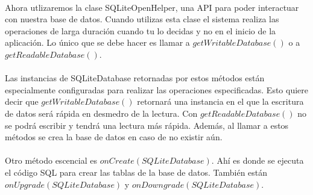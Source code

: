 \documentclass[10pt]{extarticle}
\begin{document}
\paragraph{}
Ahora utlizaremos la clase SQLiteOpenHelper, una API para poder interactuar con nuestra base de datos. Cuando utilizas esta clase el sistema realiza las operaciones de larga duración cuando tu lo decidas y no en el inicio de la aplicación. Lo único que se debe hacer es llamar a $getWritableDatabase()$ o a $getReadableDatabase()$. 
\paragraph{}
Las instancias de SQLiteDatabase retornadas por estos métodos están especialmente configuradas para realizar las operaciones especificadas. Esto quiere decir que $getWritableDatabase()$ retornará una instancia en el que la escritura de datos será rápida en desmedro de la lectura. Con $getReadableDatabase()$ no se podrá escribir y tendrá una lectura más rápida. Además, al llamar a estos métodos se crea la base de datos en caso de no existir aún.

\paragraph{}
Otro método escencial es $onCreate(SQLiteDatabase)$. Ahí es donde se ejecuta el código SQL para crear las tablas de la base de datos. También están $onUpgrade(SQLiteDatabase)$ y $onDowngrade(SQLiteDatabase)$.
\end{document}
